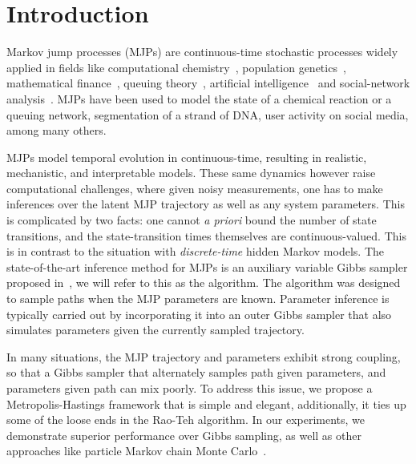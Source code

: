 
\section{Introduction}
\label{sec:intro}
Markov jump processes (MJPs) are continuous-time stochastic processes 
widely applied in fields like computational chemistry~\cite{gillespie97}, 
population genetics~\cite{FearnSher2006}, mathematical finance~\cite{Elliott06}, 
queuing theory~\cite{Breuer2003}, artificial intelligence~\cite{XuShe10} and
social-network analysis~\cite{pan2016markov}. %
MJPs have been used to model the state of a chemical reaction 
or a queuing network, segmentation of a strand of DNA, user activity on social 
media, among many others.

MJPs model temporal evolution in continuous-time, resulting in 
realistic, mechanistic, and interpretable models. %
These same dynamics however raise computational
challenges, where given noisy 
measurements, one has to make inferences over the latent MJP 
trajectory as well as any system parameters. 
This is complicated by two facts: one cannot {\em a priori} 
bound the number of state transitions, and the state-transition times themselves
are continuous-valued. This is in contrast to the situation with
{\em discrete-time} hidden Markov models. %
The state-of-the-art inference method for MJPs is an auxiliary variable Gibbs sampler proposed 
in~\cite{RaoTeh13}, we will refer to this as the {\algname} 
algorithm. The {\algname} algorithm was designed to sample paths when the MJP parameters
are known. Parameter inference is typically carried out by 
incorporating it into an outer Gibbs sampler that also simulates
parameters given the currently sampled trajectory. 

In many situations, the MJP trajectory and parameters exhibit 
strong coupling, so that a Gibbs sampler that alternately samples path given
parameters, and parameters given path can mix poorly.  
To address this issue, we propose a Metropolis-Hastings framework 
that is simple and elegant, additionally,
it ties up some of the loose ends in the Rao-Teh algorithm.
In our experiments, we demonstrate superior 
performance over Gibbs sampling, as well as other approaches like 
particle Markov chain Monte Carlo~\cite{Andrieu10}.

